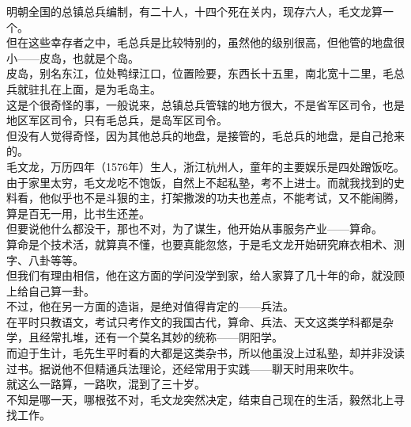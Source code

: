 \begin{multicols}{\theparacolNo}
明朝全国的总镇总兵编制，有二十人，十四个死在关内，现存六人，毛文龙算一个。\\

但在这些幸存者之中，毛总兵是比较特别的，虽然他的级别很高，但他管的地盘很小——皮岛，也就是个岛。\\

皮岛，别名东江，位处鸭绿江口，位置险要，东西长十五里，南北宽十二里，毛总兵就驻扎在上面，是为毛岛主。\\

这是个很奇怪的事，一般说来，总镇总兵管辖的地方很大，不是省军区司令，也是地区军区司令，只有毛总兵，是岛军区司令。\\

但没有人觉得奇怪，因为其他总兵的地盘，是接管的，毛总兵的地盘，是自己抢来的。\\

毛文龙，万历四年（1576年）生人，浙江杭州人，童年的主要娱乐是四处蹭饭吃。\\

由于家里太穷，毛文龙吃不饱饭，自然上不起私塾，考不上进士。而就我找到的史料看，他似乎也不是斗狠的主，打架撒泼的功夫也差点，不能考试，又不能闹腾，算是百无一用，比书生还差。\\

但要说他什么都没干，那也不对，为了谋生，他开始从事服务产业——算命。\\

算命是个技术活，就算真不懂，也要真能忽悠，于是毛文龙开始研究麻衣相术、测字、八卦等等。\\

但我们有理由相信，他在这方面的学问没学到家，给人家算了几十年的命，就没顾上给自己算一卦。\\

不过，他在另一方面的造诣，是绝对值得肯定的——兵法。\\

在平时只教语文，考试只考作文的我国古代，算命、兵法、天文这类学科都是杂学，且经常扎堆，还有一个莫名其妙的统称——阴阳学。\\

而迫于生计，毛先生平时看的大都是这类杂书，所以他虽没上过私塾，却并非没读过书。据说他不但精通兵法理论，还经常用于实践——聊天时用来吹牛。\\

就这么一路算，一路吹，混到了三十岁。\\

不知是哪一天，哪根弦不对，毛文龙突然决定，结束自己现在的生活，毅然北上寻找工作。\\


\end{multicols}
